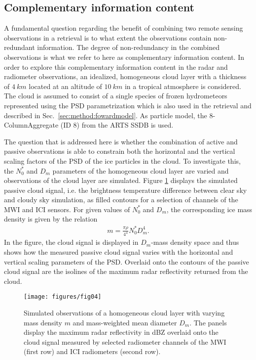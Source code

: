 \documentclass[journal abbreviation, manuscript]{copernicus}
\begin{document}
\subsection{Complementary information content}
\label{sec:simple_cloud}

A fundamental question regarding the benefit of combining two remote sensing
observations in a retrieval is to what extent the observations contain
non-redundant information. The degree of non-redundancy in the combined
observations is what we refer to here as complementary information content.
In order to explore this complementary information content in the radar and
radiometer observations, an idealized, homogeneous cloud layer with a thickness
of $4\ \unit{km}$ located at an altitude of $10\ \unit{km}$ in a tropical
atmosphere is considered. The cloud is assumed to consist of a single species of
frozen hydrometeors represented using the PSD parametrization which is also used
in the retrieval and described in Sec.~\ref{sec:method:fowardmodel}. As particle
model, the 8-ColumnAggregate (ID 8) from the ARTS SSDB is used.

The question that is addressed here is whether the combination of active
and passive observations is able to constrain both the horizontal and the
vertical scaling factors of the PSD of the ice particles in the cloud. To
investigate this, the $N_0^*$ and $D_m$ parameters of the homogeneous cloud
layer are varied and observations of the cloud layer are simulated. Figure
\ref{fig:contours} displays the simulated passive cloud signal, i.e. the brightness
temperature difference between clear sky and cloudy sky simulation, as filled
contours for a selection of channels of the MWI and ICI sensors. For given
values of $N_0^*$ and $D_m$, the corresponding ice mass density is given by
the relation
\begin{align}
m = \frac{\pi \rho}{4 ^ 4}N_0^* D_m^4.
\end{align}
In the figure, the cloud signal is displayed in $D_m$-mass density space and
thus shows how the measured passive cloud signal varies with the horizontal and
vertical scaling parameters of the PSD. Overlaid onto the contours of the
passive cloud signal are the isolines of the maximum radar reflectivity returned
from the cloud.

\begin{figure}
\centering
\texttt{[image: figures/fig04]}
\caption{Simulated observations of a homogeneous cloud layer with
varying mass density $m$ and mass-weighted mean diameter $D_m$. The panels
display the maximum radar reflectivity in dBZ  overlaid onto the
cloud signal measured by selected radiometer channels of the MWI
(first row) and  ICI radiometers (second row).}
\label{fig:contours}
\end{figure}
\end{document}
